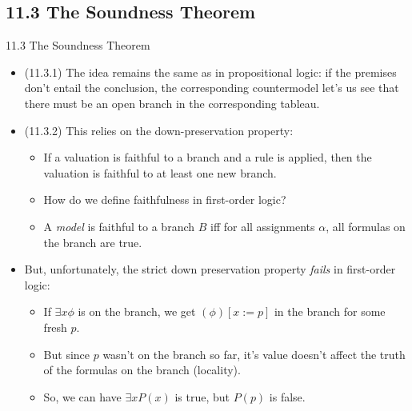 \subsection{11.3 The Soundness Theorem}

\begin{frame}{11.3 The Soundness Theorem}

  \begin{itemize}
  \item (11.3.1) The idea remains the same as in propositional logic:
    if the premises don't entail the conclusion, the corresponding
    countermodel let's us see that there must be an open branch in the
    corresponding tableau.

  \item (11.3.2) This relies on the down-preservation property:

    \begin{itemize}
    \item If a valuation is faithful to a branch and a rule is
      applied, then the valuation is faithful to at least one new
      branch.
    \item How do we define faithfulness in first-order logic?

      \item A \emph{model} is faithful to a branch $B$ iff for all
        assignments $\alpha$, all formulas on the branch are true.
    \end{itemize}

    \item But, unfortunately, the strict down preservation property
      \emph{fails} in first-order logic:
      \begin{itemize}
      \item If $\exists x\phi$ is on the branch, we get $(\phi)[x:=p]$
        in the branch for some fresh $p$.

      \item But since $p$ wasn't on the branch so far, it's value
        doesn't affect the truth of the formulas on the branch
        (locality).
        \item So, we can have $\exists xP(x)$ is true, but $P(p)$ is false.
      \end{itemize}
  \end{itemize}
  
\end{frame}


